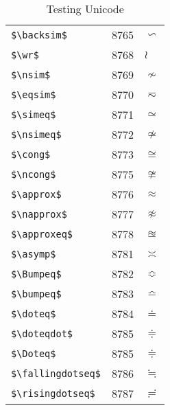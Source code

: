 \documentclass{article}
\begin{document}
\begin{table}
\begin{center}
\begin{tabular}{lll}
\verb#$\backsim$# & 8765 & $\backsim$\\ 
\verb#$\wr$# & 8768 & $\wr$\\ 
\verb#$\nsim$# & 8769 & $\nsim$\\ 
\verb#$\eqsim$# & 8770 & $\eqsim$\\ 
\verb#$\simeq$# & 8771 & $\simeq$\\ 
\verb#$\nsimeq$# & 8772 & $\nsimeq$\\ 
\verb#$\cong$# & 8773 & $\cong$\\ 
\verb#$\ncong$# & 8775 & $\ncong$\\ 
\verb#$\approx$# & 8776 & $\approx$\\ 
\verb#$\napprox$# & 8777 & $\napprox$\\ 
\verb#$\approxeq$# & 8778 & $\approxeq$\\ 
\verb#$\asymp$# & 8781 & $\asymp$\\ 
\verb#$\Bumpeq$# & 8782 & $\Bumpeq$\\ 
\verb#$\bumpeq$# & 8783 & $\bumpeq$\\ 
\verb#$\doteq$# & 8784 & $\doteq$\\ 
\verb#$\doteqdot$# & 8785 & $\doteqdot$\\ 
\verb#$\Doteq$# & 8785 & $\Doteq$\\ 
\verb#$\fallingdotseq$# & 8786 & $\fallingdotseq$\\ 
\verb#$\risingdotseq$# & 8787 & $\risingdotseq$\\ 
\end{tabular}
\end{center}
\caption{Testing Unicode}
\end{table}
\clearpage
\end{document}
